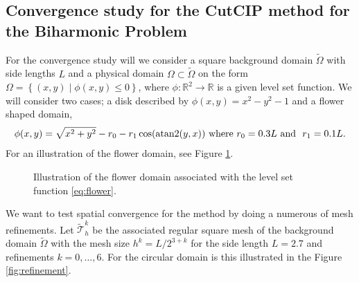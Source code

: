 \subsection{ Convergence study for the CutCIP method for the Biharmonic Problem  }%
\label{sub:numerical_results_for_cutcip_biharmonic_equation}
For the convergence study will we consider a square background domain $\widetilde{\Omega} $ with side lengths $L$ and a physical domain $\Omega \subset \widetilde{\Omega}$ on the form $\Omega  = \left\{ ( x,y)  \mid \phi ( x,y) \le 0    \right\} $,
where $\phi: \mathbb{R} ^2 \to \mathbb{R}  $ is a given level set function. We will consider two cases; a disk described by $\phi( x,y) = x^{ 2} - y^{2} -1  $ and a flower shaped domain,
\begin{equation}
\label{eq:flower}
\phi ( x,y) =\sqrt{x^{2} + y^{2}} - r_{0} - r_{1}\cos(\operatorname{atan2}(y,x)) \text{ where }  r_{0} = 0.3L  \text{ and } \ r_{1} = 0.1L .
\end{equation}
For an illustration of the flower domain, see Figure \ref{fig:flower}.

\begin{figure}[h!]
    \centering
{}
\caption{Illustration of the flower domain associated with the level set function \eqref{eq:flower}.}
    \label{fig:flower}
\end{figure}


We want to test spatial convergence for the method by doing a numerous of mesh refinements. Let $ \widetilde{\mathcal{T}}_{h}^{k} $ be the associated regular square mesh of the background domain $\widetilde{\Omega }$ with the mesh size  $h^{k} = L/2^{3+k} $
for the side length $L=2.7$ and refinements
$k=0, \ldots, 6$. For the circular domain is this illustrated in the Figure \ref{fig:refinement}.

